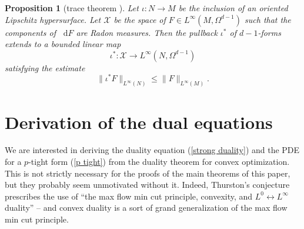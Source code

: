 \documentclass[reqno,11pt]{amsart}
\newcommand{\RR}{\mathbf{R}}
\newcommand*\dif{\mathop{}\!\mathrm{d}}
\newcommand{\Mass}{\mathbf M}
\newcommand{\dfn}[1]{\emph{#1}\index{#1}}
\newcommand{\loc}{\mathrm{loc}}
\newcommand{\cpt}{\mathrm{cpt}}
\newtheorem{proposition}[theorem]{Proposition}
\theoremstyle{definition}
\numberwithin{equation}{section}
\begin{document}
\begin{proposition}[trace theorem {\cite[Theorem 1.2]{Anzellotti1983}}]\label{integration is welldefined}
Let $\iota: N \to M$ be the inclusion of an oriented Lipschitz hypersurface.
Let $\mathcal X$ be the space of $F \in L^\infty(M, \Omega^{d - 1})$ such that the components of $\dif F$ are Radon measures.
Then the pullback $\iota^*$ of $d - 1$-forms extends to a bounded linear map
$$\iota^*: \mathcal X \to L^\infty(N, \Omega^{d - 1})$$
satisfying the estimate
\begin{equation}\label{integral over chain is linfinity}
	\|\iota^* F\|_{L^\infty(N)} \leq \|F\|_{L^\infty(M)}.
\end{equation}
\end{proposition}



\section{Derivation of the dual equations}\label{duality derivation}
We are interested in deriving the duality equation (\ref{strong duality}) and the PDE for a $p$-tight form (\ref{p tight}) from the duality theorem for convex optimization.
This is not strictly necessary for the proofs of the main theorems of this paper, but they probably seem unmotivated without it.
Indeed, Thurston's conjecture prescribes the use of ``the max flow min cut principle, convexity, and $L^0 \leftrightarrow L^\infty$ duality'' -- and convex duality is a sort of grand generalization of the max flow min cut principle.
\end{document}
